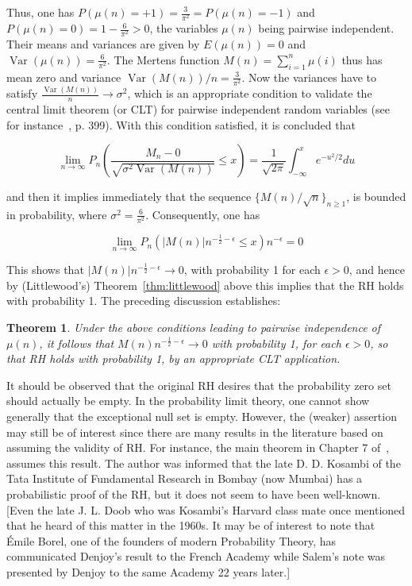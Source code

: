 \documentclass[11pt]{article}
\newtheorem{theorem}{Theorem}
\begin{document}
Thus, one has $P(\mu(n) = +1) = \frac{3}{\pi^2} = P(\mu(n) = -1)$ and $P(\mu(n) = 0) = 1 - \frac{6}{\pi^2} > 0$, the variables $\mu(n)$ being pairwise independent. Their means and variances are given by $E(\mu(n)) = 0$ and $\operatorname{Var}(\mu(n)) = \frac{6}{\pi^2}$. The Mertens function $M(n) = \sum_{i=1}^n \mu(i)$ thus has mean zero and variance $\operatorname{Var}(M(n))/n = \frac{3}{\pi^2}$. Now the variances have to satisfy $\frac{\operatorname{Var}(M(n))}{n} \to \sigma^2$, which is an appropriate condition to validate the central limit theorem (or CLT) for pairwise independent random variables (see for instance~\cite{rao}, p. 399). With this condition satisfied, it is concluded that

\begin{equation}
\label{eq:clt}
\lim_{n \to \infty} P_n \left( \frac{M_n - 0}{\sqrt{\sigma^2 \operatorname{Var}(M(n))}} \leq x \right) = \frac{1}{\sqrt{2\pi}} \int_{-\infty}^x e^{-u^2/2} du
\end{equation}

and then it implies immediately that the sequence $\{M(n)/\sqrt{n}\}_{n \geq 1}$, is bounded in probability, where $\sigma^2 = \frac{6}{\pi^2}$. Consequently, one has

\begin{equation}
\label{eq:prob_result}
\lim_{n \to \infty} P_n(|M(n)| n^{-\frac{1}{2} - \epsilon} \leq x) n^{-\epsilon} = 0
\end{equation}

This shows that $|M(n)| n^{-\frac{1}{2} - \epsilon} \to 0$, with probability 1 for each $\epsilon > 0$, and hence by (Littlewood's) Theorem~\ref{thm:littlewood} above this implies that the RH holds with probability 1. The preceding discussion establishes:

\begin{theorem}
\label{thm:denjoy}
Under the above conditions leading to pairwise independence of $\mu(n)$, it follows that $M(n) n^{-\frac{1}{2} - \epsilon} \to 0$ with probability 1, for each $\epsilon > 0$, so that RH holds with probability 1, by an appropriate CLT application.
\end{theorem}

It should be observed that the original RH desires that the probability zero set should actually be empty. In the probability limit theory, one cannot show generally that the exceptional null set is empty. However, the (weaker) assertion may still be of interest since there are many results in the literature based on assuming the validity of RH. For instance, the main theorem in Chapter 7 of~\cite{laurincikas}, assumes this result. The author was informed that the late D. D. Kosambi of the Tata Institute of Fundamental Research in Bombay (now Mumbai) has a probabilistic proof of the RH, but it does not seem to have been well-known. [Even the late J. L. Doob who was Kosambi's Harvard class mate once mentioned that he heard of this matter in the 1960s. It may be of interest to note that Émile Borel, one of the founders of modern Probability Theory, has communicated Denjoy's result to the French Academy while Salem's note was presented by Denjoy to the same Academy 22 years later.]
\end{document}
